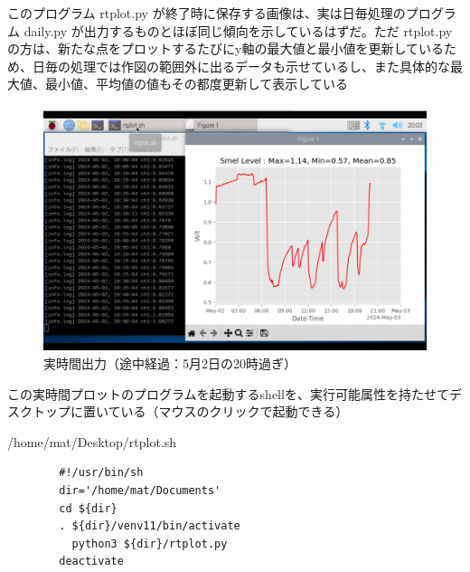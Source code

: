 \documentclass[12pt,a4j]{jsbook}
\begin{document}
このプログラム rtplot.py が終了時に保存する画像は、実は日毎処理のプログラム daily.py が出力するものとほぼ同じ傾向を示しているはずだ。ただ rtplot.py の方は、新たな点をプロットするたびにy軸の最大値と最小値を更新しているため、日毎の処理では作図の範囲外に出るデータも示せているし、また具体的な最大値、最小値、平均値の値もその都度更新して表示している

\begin{figure}[htbp]
	\begin{minipage}[b]{1.0\linewidth}
		\centering
		\includegraphics[keepaspectratio, scale=0.26]{figs/png/screen2.png}
		\caption{実時間出力（途中経過：5月2日の20時過ぎ）}
	\end{minipage}
\end{figure}

この実時間プロットのプログラムを起動するshellを、実行可能属性を持たせてデスクトップに置いている（マウスのクリックで起動できる）

\begin{spacing}{0.95}
\begin{itembox}[l]{/home/mat/Desktop/rtplot.sh}
\begin{verbatim}
		#!/usr/bin/sh
		dir='/home/mat/Documents'
		cd ${dir}
		. ${dir}/venv11/bin/activate
		  python3 ${dir}/rtplot.py
		deactivate
\end{verbatim}
\end{itembox}
\end{spacing}
\end{document}

